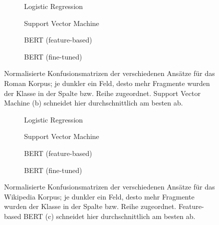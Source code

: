 

\begin{figure}
\centering
\begin{subfigure}[b]{.45\linewidth}

\caption{Logistic Regression}\label{fig:romane-log}
\end{subfigure}
\begin{subfigure}[b]{.45\linewidth}

\caption{Support Vector Machine}\label{fig:romane-svm}
\end{subfigure}

\begin{subfigure}[b]{.45\linewidth}

\caption{BERT (feature-based)}\label{fig:romane-feat}
\end{subfigure}
\begin{subfigure}[b]{.45\linewidth}

\caption{BERT (fine-tuned)}\label{fig:romane-fine}
\end{subfigure}
\caption{Normalisierte Konfusionsmatrizen der verschiedenen Ansätze für das Roman Korpus; je dunkler ein Feld, desto mehr Fragmente wurden der Klasse in der Spalte bzw. Reihe zugeordnet. Support Vector Machine (b) schneidet hier durchschnittlich am besten ab.}
\label{fig:roman}
\end{figure}




\begin{figure}
\centering
\begin{subfigure}[b]{.45\linewidth}

\caption{Logistic Regression}\label{fig:wikipedia-log}
\end{subfigure}
\begin{subfigure}[b]{.45\linewidth}

\caption{Support Vector Machine}\label{fig:wikipedia-svm}
\end{subfigure}

\begin{subfigure}[b]{.45\linewidth}

\caption{BERT (feature-based)}\label{fig:wikipedia-feat}
\end{subfigure}
\begin{subfigure}[b]{.45\linewidth}

\caption{BERT (fine-tuned)}\label{fig:wikipedia-fine}
\end{subfigure}
\caption{Normalisierte Konfusionsmatrizen der verschiedenen Ansätze für das Wikipedia Korpus; je dunkler ein Feld, desto mehr Fragmente wurden der Klasse in der Spalte bzw. Reihe zugeordnet. Feature-based BERT (c) schneidet hier durchschnittlich am besten ab.}
\label{fig:roman}
\end{figure}






